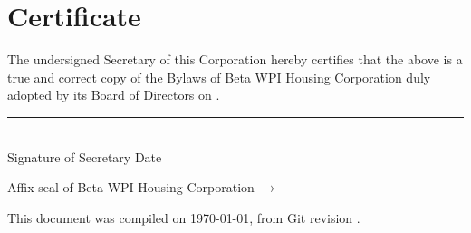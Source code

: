 \chapter*{Certificate}

\thispagestyle{certificate}

The undersigned Secretary of this Corporation hereby certifies that the above
is a true and correct copy of the Bylaws of Beta WPI Housing Corporation duly
adopted by its Board of Directors on \dateadopted.

\vspace{0.4in}
\noindent \rule{3.5in}{0.8pt}\\
Signature of Secretary
\hspace{1in}
Date

\vspace{0.4in}
Affix seal of Beta WPI Housing Corporation $\rightarrow$

\vfill

\begin{center} 

\small This document was compiled on \today, from Git revision \Revision. 

\end{center}
